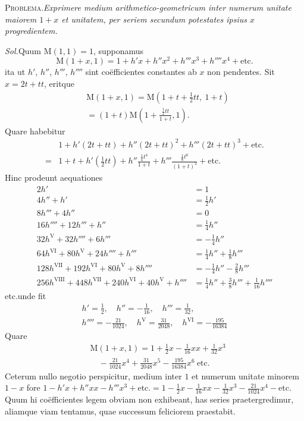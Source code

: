 
\textsc{Problema.}\quad \textit{Exprimere medium arithmetico-geometricum inter numerum unitate maiorem $1+x$ et unitatem, per seriem secundum potestates ipsius $x$ progredientem.}

\textit{Sol.}\quad Quum $\mathrm M(1,1)=1$, supponamus
\[
\mathrm M(1+x,1)=1+h'x+h''x^2+h'''x^3+h''''x^4+\text{etc.}
\]
ita ut $h'$, $h''$, $h'''$, $h''''$ sint coëfficientes constantes ab $x$ non pendentes.
Sit $x=2t+tt$, eritque
\[
\begin{aligned}&\mathrm M(1+x,1)=\mathrm M(1+t+\tfrac12tt,\ 1+t)\\&=(1+t)\mathrm M(1+\frac{\tfrac12tt}{1+t},1).\end{aligned}
\]
Quare habebitur
\[
\begin{aligned}
&1+h'(2t+tt)+h''(2t+tt)^2+h'''(2t+tt)^3+\text{etc.}\\[6pt]
={}&1+t+h'(\tfrac12tt)+h''\frac{\tfrac14t^4}{1+t}+h'''\frac{\tfrac18t^6}{(1+t)^2}+\text{etc.}
\end{aligned}
\]
Hinc prodeunt aequationes
\[
\begin{aligned}
2h'&=1\\[6pt]
4h''+h'&=\tfrac12h'\\[6pt]
8h'''+4h''&=0\\[6pt]
16h''''+12h'''+h''&=\tfrac14h''\\[6pt]
32h^{\mathrm V}+32h''''+6h'''&=-\tfrac14h''\\[6pt]
64h^{\mathrm{VI}}+80h^{\mathrm V}+24h''''+h'''&=\tfrac14h''+\tfrac18h'''\\[6pt]
128h^{\mathrm{VII}}+192h^{\mathrm{VI}}+80h^{\mathrm V}+8h''''&=-\tfrac14h''-\tfrac28h'''\\[6pt]
256h^{\mathrm{VIII}}+448h^{\mathrm{VII}}+240h^{\mathrm{VI}}+40h^{\mathrm V}+h''''&=\tfrac14h''+\tfrac38h'''+\tfrac1{16}h''''
\end{aligned}
\]
etc.\quad unde fit
\[
\begin{gathered}h'=\tfrac12,\quad h''=-\tfrac1{16},\quad h'''=\tfrac1{32},\\ h''''=-\tfrac{21}{1024},\quad h^{\mathrm V}=\tfrac{31}{2048},\quad h^{\mathrm{VI}}=-\tfrac{195}{16384}\end{gathered}
\]
Quare
\[
\begin{aligned}&\mathrm M(1+x,1)=1+\tfrac12x-\tfrac1{16}xx+\tfrac1{32}x^3\\&\quad-\tfrac{21}{1024}x^4+\tfrac{31}{2048}x^5-\tfrac{195}{16384}x^6\ \text{etc.}\end{aligned}
\]
Ceterum nullo negotio perspicitur, medium inter $1$ et numerum unitate minorem
\(1-x\) fore \(1-h'x+h''xx-h'''x^3+\text{etc.}=1-\frac12x-\frac1{16}xx-\frac1{32}x^3-\frac{21}{1024}x^4-\text{etc.}\)
Quum hi co\"efficientes legem obviam non exhibeant, has series praetergredimur,
aliamque viam tentamus, quae successum feliciorem praestabit.

